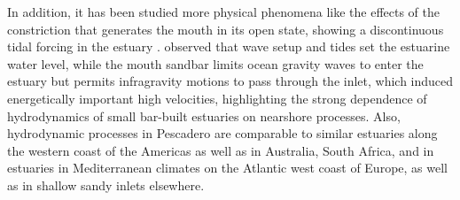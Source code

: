 \documentclass[tesis.tex]{subfiles}
\begin{document}
In addition, it has been studied more physical phenomena like the effects of the constriction that generates the mouth in its open state, showing a discontinuous tidal forcing in the estuary \citep{williams2016}. \cite{williams2016} observed that wave setup and tides set the estuarine water level, while the mouth sandbar limits ocean gravity waves to enter the estuary but permits infragravity motions to pass through the inlet, which induced energetically important high velocities, highlighting the strong dependence of hydrodynamics of small bar-built estuaries on nearshore processes. Also, hydrodynamic processes in Pescadero are comparable to similar estuaries along the western coast of the Americas as well as in Australia, South Africa, and in estuaries in Mediterranean climates on the Atlantic west coast of Europe, as well as in shallow sandy inlets elsewhere.\\
\end{document}
